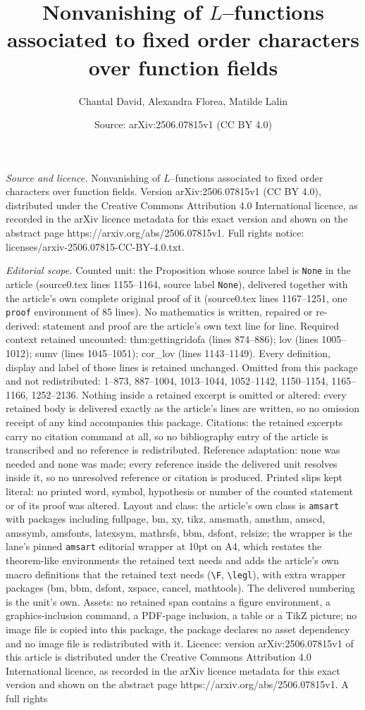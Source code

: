 \documentclass[10pt,a4paper]{amsart}
\title[Nonvanishing of $L$--functions associated to fixed order cha]{Nonvanishing of $L$--functions associated to fixed order characters over function fields}
\author{Chantal David, Alexandra Florea, Matilde Lalin}
\date{Source: arXiv:2506.07815v1 (CC BY 4.0)}
\begin{document}
\maketitle

\noindent\emph{Source and licence.} Nonvanishing of $L$--functions associated to fixed order characters over function fields. Version arXiv:2506.07815v1 (CC BY 4.0), distributed under the Creative Commons Attribution 4.0 International licence, as recorded in the arXiv licence metadata for this exact version and shown on the abstract page https://arxiv.org/abs/2506.07815v1. Full rights notice: licenses/arxiv-2506.07815-CC-BY-4.0.txt.\par\smallskip

\noindent\textit{Editorial scope.} Counted unit: the Proposition whose source label is \texttt{None} in the article (source0.tex lines 1155--1164, source label \texttt{None}), delivered together with the article's own complete original proof of it (source0.tex lines 1167--1251, one \texttt{proof} environment of 85 lines). No mathematics is written, repaired or re-derived: statement and proof are the article's own text line for line. Required context retained uncounted: thm:gettingridofa (lines 874--886); lov (lines 1005--1012); sumv (lines 1045--1051); cor\_lov (lines 1143--1149). Every definition, display and label of those lines is retained unchanged. Omitted from this package and not redistributed: 1--873, 887--1004, 1013--1044, 1052--1142, 1150--1154, 1165--1166, 1252--2136. Nothing inside a retained excerpt is omitted or altered: every retained body is delivered exactly as the article's lines are written, so no omission receipt of any kind accompanies this package. Citations: the retained excerpts carry no citation command at all, so no bibliography entry of the article is transcribed and no reference is redistributed. Reference adaptation: none was needed and none was made; every reference inside the delivered unit resolves inside it, so no unresolved reference or citation is produced. Printed slips kept literal: no printed word, symbol, hypothesis or number of the counted statement or of its proof was altered. Layout and class: the article's own class is \texttt{amsart} with packages including fullpage, bm, xy, tikz, amsmath, amsthm, amscd, amssymb, amsfonts, latexsym, mathrsfs, bbm, dsfont, relsize; the wrapper is the lane's pinned \texttt{amsart} editorial wrapper at 10pt on A4, which restates the theorem-like environments the retained text needs and adds the article's own macro definitions that the retained text needs (\texttt{\textbackslash F}, \texttt{\textbackslash legl}), with extra wrapper packages (bm, bbm, dsfont, xspace, cancel, mathtools). The delivered numbering is the unit's own. Assets: no retained span contains a figure environment, a graphics-inclusion command, a PDF-page inclusion, a table or a TikZ picture; no image file is copied into this package, the package declares no asset dependency and no image file is redistributed with it. Licence: version arXiv:2506.07815v1 of this article is distributed under the Creative Commons Attribution 4.0 International licence, as recorded in the arXiv licence metadata for this exact version and shown on the abstract page https://arxiv.org/abs/2506.07815v1. A full rights 
\end{document}
